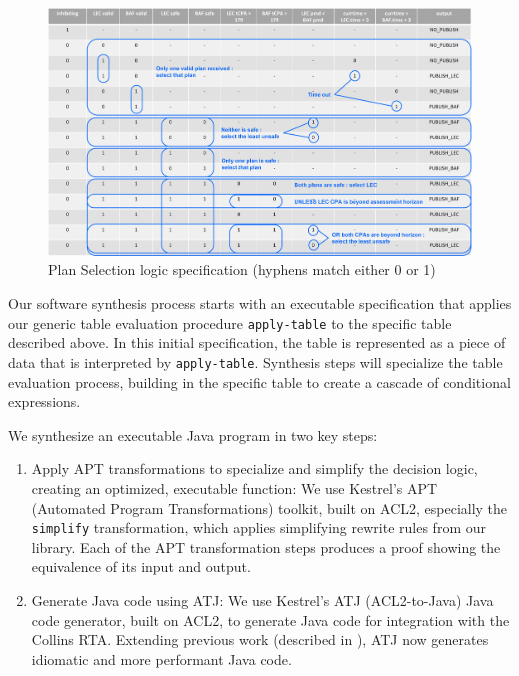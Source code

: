 \begin{figure}
	\centering
	\includegraphics[width=\textwidth]{figures/selection-logic.jpg}
	\caption{Plan Selection logic specification (hyphens match either 0 or 1)}
	\label{fig:selection-logic}
\end{figure}

Our software synthesis process starts with an executable specification that applies our generic table evaluation procedure \texttt{apply-table} to the specific table described above.  In this initial specification, the table is represented as a piece of data that is interpreted by \texttt{apply-table}.  Synthesis steps will specialize the table evaluation process, building in the specific table to create a cascade of conditional expressions.

We synthesize an executable Java program in two key steps:
\begin{enumerate}

\item Apply APT transformations to specialize and simplify the
  decision logic, creating an optimized, executable function: We use Kestrel's
  APT (Automated Program Transformations) \cite{apt} toolkit, built on ACL2,
  especially the \texttt{simplify} transformation, which applies simplifying
  rewrite rules from our library.
  Each of the APT transformation steps produces a proof showing the equivalence
  of its input and output.

\item Generate Java code using ATJ\cite{atj}: We use Kestrel's ATJ (ACL2-to-Java) Java
  code generator, built on ACL2, to generate Java code for integration with the
  Collins RTA.  Extending previous work (described in \cite{dasc2020}), ATJ now
  generates idiomatic and more performant Java code.

\end{enumerate}

